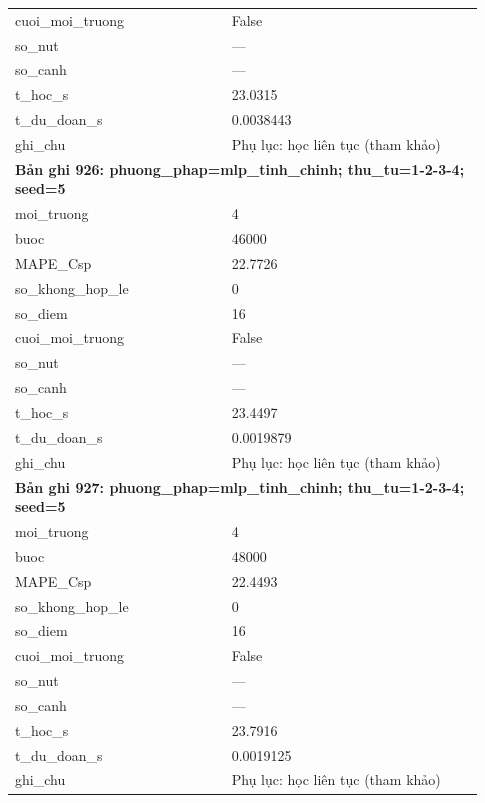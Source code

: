 \begin{longtable}{p{0.43\linewidth}p{0.50\linewidth}}
cuoi\_\allowbreak moi\_\allowbreak truong & False \\
so\_\allowbreak nut & — \\
so\_\allowbreak canh & — \\
t\_\allowbreak hoc\_\allowbreak s & 23.0315 \\
t\_\allowbreak du\_\allowbreak doan\_\allowbreak s & 0.0038443 \\
ghi\_\allowbreak chu & Phụ lục: học liên tục (tham khảo) \\
\midrule
\multicolumn{2}{p{0.95\linewidth}}{\textbf{Bản ghi 926: phuong\_phap=mlp\_tinh\_chinh; thu\_tu=1-2-3-4; seed=5}} \\
moi\_\allowbreak truong & 4 \\
buoc & 46000 \\
MAPE\_\allowbreak Csp & 22.7726 \\
so\_\allowbreak khong\_\allowbreak hop\_\allowbreak le & 0 \\
so\_\allowbreak diem & 16 \\
cuoi\_\allowbreak moi\_\allowbreak truong & False \\
so\_\allowbreak nut & — \\
so\_\allowbreak canh & — \\
t\_\allowbreak hoc\_\allowbreak s & 23.4497 \\
t\_\allowbreak du\_\allowbreak doan\_\allowbreak s & 0.0019879 \\
ghi\_\allowbreak chu & Phụ lục: học liên tục (tham khảo) \\
\midrule
\multicolumn{2}{p{0.95\linewidth}}{\textbf{Bản ghi 927: phuong\_phap=mlp\_tinh\_chinh; thu\_tu=1-2-3-4; seed=5}} \\
moi\_\allowbreak truong & 4 \\
buoc & 48000 \\
MAPE\_\allowbreak Csp & 22.4493 \\
so\_\allowbreak khong\_\allowbreak hop\_\allowbreak le & 0 \\
so\_\allowbreak diem & 16 \\
cuoi\_\allowbreak moi\_\allowbreak truong & False \\
so\_\allowbreak nut & — \\
so\_\allowbreak canh & — \\
t\_\allowbreak hoc\_\allowbreak s & 23.7916 \\
t\_\allowbreak du\_\allowbreak doan\_\allowbreak s & 0.0019125 \\
ghi\_\allowbreak chu & Phụ lục: học liên tục (tham khảo) \\

\end{longtable}
